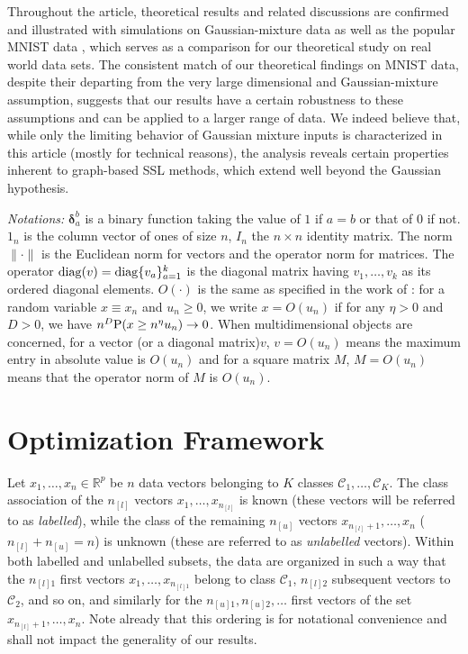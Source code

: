 \documentclass[twoside,11pt]{article}
\begin{document}
Throughout the article, theoretical results and related discussions are confirmed and illustrated with simulations on Gaussian-mixture data as well as the popular MNIST data \citep{lecun1998mnist}, which serves as a comparison for our theoretical study on real world data sets. The consistent match of our theoretical findings on MNIST data, despite their departing from the very large dimensional and Gaussian-mixture assumption, suggests that our results have a certain robustness to these assumptions and can be applied to a larger range of data. We indeed believe that, while only the limiting behavior of Gaussian mixture inputs is characterized in this article (mostly for technical reasons), the analysis reveals certain properties inherent to graph-based SSL methods, which extend well beyond the Gaussian hypothesis.

\medskip

\textit{Notations:} ${\bm\delta}_a^b$ is a binary function taking the value of $1$ if $a=b$ or that of $0$ if not. $1_{n}$ is the column vector of ones of size $n$, $I_{n}$ the $n\times n$ identity matrix. The norm $\|\cdot\|$ is the Euclidean norm for vectors
and the operator norm for matrices. The operator ${\rm diag}(v)={\rm diag}\{v_a\}_{a=1}^k$ is the diagonal matrix having $v_1,\ldots,v_k$ as its ordered diagonal elements. $O(\cdot)$ is the same as specified in the work of \citet{couillet2015kernel}: for a random variable $x\equiv x_n$ and $u_n\ge 0$, we write $x=O(u_n)$ if for any $\eta>0$ and $D>0$, we have $n^D{\rm P}(x\ge n^\eta u_n)\to 0$. When multidimensional objects are concerned, for a vector (or a diagonal matrix)$v$, $v=O(u_n)$ means the maximum entry in absolute value is $O(u_n)$ and for a square matrix $M$, $M=O(u_n)$ means that the operator norm of $M$ is $O(u_n)$. 

\section{Optimization Framework}
\label{sec:optimization}
Let $x_{1},\ldots,x_{n}\in\mathbb{R}^{p}$ be $n$ data vectors belonging to $K$ classes ${\mathcal C}_{1},\ldots,{\mathcal C}_{K}$. The class association of the $n_{[l]}$ vectors $x_{1},\ldots,x_{n_{[l]}}$ is known (these vectors will be referred to as \textit{labelled}), while the class of the remaining $n_{[u]}$ vectors $x_{n_{[l]}+1},\ldots,x_{n}$ ($n_{[l]}+n_{[u]}=n$) is unknown (these are referred to as \textit{unlabelled} vectors). Within both labelled and unlabelled subsets, the data are organized in such a way that the $n_{[l]1}$ first vectors $x_1,\ldots,x_{n_{[l]1}}$ belong to class $\mathcal C_1$, $n_{[l]2}$ subsequent vectors to $\mathcal C_2$, and so on, and similarly for the $n_{[u]1},n_{[u]2},\ldots$ first vectors of the set $x_{n_{[l]}+1},\ldots,x_{n}$. Note already that this ordering is for notational convenience and shall not impact the generality of our results.
\end{document}
